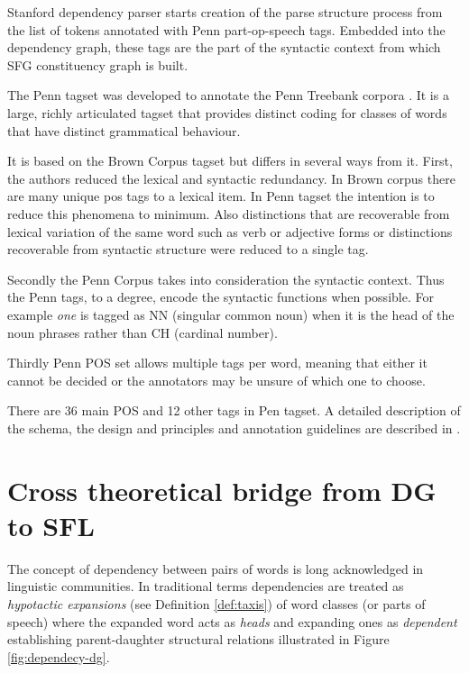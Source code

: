 Stanford dependency parser starts creation of the parse structure process from the list of tokens annotated with Penn part-op-speech tags. Embedded into the dependency graph, these tags are the part of the syntactic context from which SFG constituency graph is built. 

The Penn tagset was developed to annotate the Penn Treebank corpora \citep{Marcus1993}. It is a large, richly articulated tagset that provides distinct coding for classes of words that have distinct grammatical behaviour.

It is based on the Brown Corpus tagset \citep{Kucera1968} but differs in several ways from it. First, the authors reduced the lexical and syntactic redundancy. In Brown corpus there are many unique pos tags to a lexical item. In Penn tagset the intention is to reduce this  phenomena to minimum. Also distinctions that are recoverable from lexical variation of the same word such as verb or adjective forms or distinctions recoverable from syntactic structure were reduced to a single tag. 

Secondly the Penn Corpus takes into consideration the syntactic context. Thus the Penn tags, to a degree, encode the syntactic functions when possible. For example \textit{one} is tagged as NN (singular common noun) when it is the head of the noun phrases rather than CH (cardinal number). 

Thirdly Penn POS set allows multiple tags per word, meaning that either it cannot be decided or the annotators may be unsure of which one to choose.  

There are 36 main POS and 12 other tags in Pen tagset. A detailed description of the schema, the design and principles and annotation guidelines are described in \citep{Santorini1990}. 

\section{Cross theoretical bridge from DG to SFL}
\label{sec:cross-theoretical-bridge}
\label{sec:dependecy-relations-sfl}

The concept of dependency between pairs of words is long acknowledged in linguistic communities. In traditional terms dependencies are treated as \textit{hypotactic expansions} (see Definition \ref{def:taxis}) of word classes (or parts of speech) where the expanded word acts as \textit{heads} and expanding ones as \textit{dependent} establishing parent-daughter structural relations illustrated in Figure \ref{fig:dependecy-dg}.


